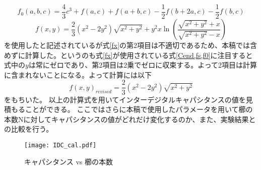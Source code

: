 \begin{equation}
    \label{f0}
    f_{0}(a, b, c) =\frac{4}{3} c^{3}+f(a, c)+f(a+b, c)-\frac{1}{2} f(b+2 a, c)-\frac{1}{2} f(b, c)
\end{equation}
\begin{equation}
    \label{fx}
    f(x, y) =\frac{2}{3}\left(x^{2}-2 y^{2}\right) \sqrt{x^{2}+y^{2}}+y^{2} x \ln \left(\frac{\sqrt{x^{2}+y^{2}}+x}{\sqrt{x^{2}+y^{2}}-x}\right)
\end{equation}
を使用したと記述されているが式\ref*{fx}の第2項目は不適切であるため、本稿では含めずに計算した。というのも式\ref*{fx}が使用されている式\ref{Cend,fs,f0}に注目すると式\label{fx}中の$y$は常にゼロであり、第2項目は2乗でゼロに収束する。よって2項目は計算に含まれないことになる。よって計算には以下
\begin{equation}
    \label{fx_re}
    f(x, y)_{revised} =\frac{2}{3}\left(x^{2}-2 y^{2}\right) \sqrt{x^{2}+y^{2}}
\end{equation}
をもちいた。
以上の計算式を用いてインターデジタルキャパシタンスの値を見積もることができる。
ここではさらに本稿で使用したパラメータを用いて櫛の本数Nに対してキャパシタンスの値がどれだけ変化するのか、また、実験結果との比較を行う。
\begin{figure}[H]
    \centering
    \texttt{[image: IDC\_cal.pdf]}
    \caption{キャパシタンス vs 櫛の本数}
\end{figure}
